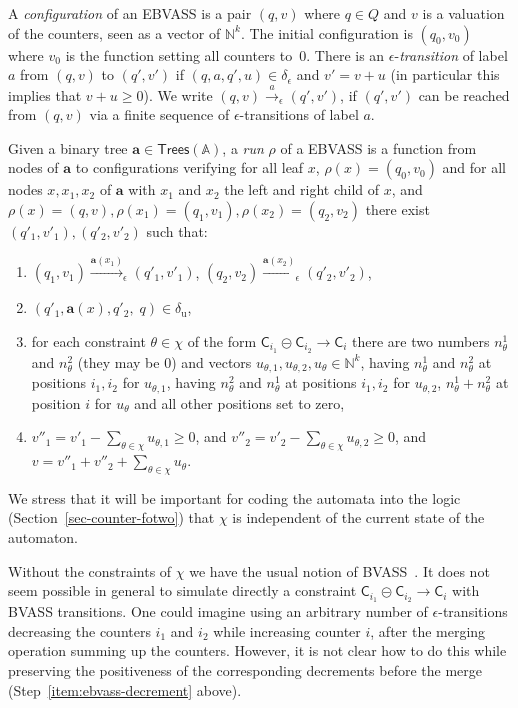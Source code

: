 \documentclass{CSML}
\newcommand\bvass{\textup{BVASS}\xspace}
\newcommand\ebvass{\textup{EBVASS}\xspace}
\newcommand\A{\ensuremath{\mathbb{A}}\xspace}
\newcommand\N{\ensuremath{\mathbb{N}}\xspace}
\newcommand\merc[3]{\mathsf{C}_{#1}\mathpunct{\circleddash}\mathsf{C}_{#2}\to\mathsf{C}_{#3}}
\newcommand\Trees{\mathsf{Trees}}
\newcommand\atree{\boldsymbol{a}}
\begin{document}
A \emph{configuration} of an \ebvass is a pair $(q,v)$ where $q\in Q$ 
and $v$ is a valuation of the counters, seen as a vector of $\N^k$. 
The initial configuration is $(q_0,v_0)$ where $v_0$ is the function setting all counters to~$0$.
There is an $\epsilon$-\emph{transition} of label $a$ from $(q,v)$ to $(q',v')$ if
$(q,a,q',u) \in \delta_\epsilon$ and $v'=v+u$ 
(in particular this implies that $v+u\geq 0$). 
We write $(q,v) \xrightarrow{a}_\epsilon (q',v')$, if $(q',v')$ can be reached from
$(q,v)$ via a finite sequence of $\epsilon$-transitions of label $a$.
 
Given a binary tree $\atree\in\Trees(\A)$, a \emph{run} $\rho$ of a \ebvass is a
function from nodes of $\atree$ to configurations verifying for all leaf $x$,
$\rho(x)=(q_0,v_0)$ and for all nodes $x,x_1,x_2$ of $\atree$ with $x_1$ and
$x_2$ the left and right child of $x$, and $\rho(x)=(q,v),
\rho(x_1)=(q_1,v_1), \rho(x_2)=(q_2,v_2)$ there exist $(q'_1,v'_1), (q'_2,v'_2)$
such that:

\begin{enumerate}
\item $(q_1,v_1) \xrightarrow{\atree(x_1)}_\epsilon (q'_1,v'_1)$, 
$(q_2,v_2) \xrightarrow{\atree(x_2)}_\epsilon (q'_2,v'_2)$,
\item $(q'_1,\atree(x),q'_2,\; q) \in \delta_{\text{u}}$,
\item for each constraint $\theta \in \chi$ of the form $\merc{i_1}{i_2}{i}$ 
there are two numbers $n^1_\theta$ and $n^2_\theta$ (they may be $0$)
and vectors $u_{\theta,1},u_{\theta,2},u_\theta \in\N^k$, having
$n^1_\theta$ and $n^2_\theta$ at positions $i_1,i_2$ for $u_{\theta,1}$, having
$n^2_\theta$ and $n^1_\theta$ at positions $i_1,i_2$ for $u_{\theta,2}$,
$n^1_\theta+n^2_\theta$ at position $i$ for $u_\theta$
and all other positions set to zero,
\item \label{item:ebvass-decrement}
      $v''_1 = v'_1 - \displaystyle\sum_{\theta\in\chi} u_{\theta,1} \geq 0$, and 
      $v''_2 = v'_2 - \displaystyle\sum_{\theta\in\chi} u_{\theta,2} \geq 0$, and
$v = v''_1 + v''_2+ \displaystyle\sum_{\theta\in\chi} u_\theta$. 
\end{enumerate}
\noindent
We stress that it will be important for coding the automata into the logic
(Section~\ref{sec-counter-fotwo}) that $\chi$ is independent of the current state of the automaton.

Without the constraints of $\chi$ we have the usual notion of
\bvass~\cite{acl10}. 
It does not seem possible in general to simulate directly a constraint
$\merc{i_1}{i_2}{i}$ with BVASS transitions.  One could imagine using an
arbitrary number of $\epsilon$-transitions decreasing the counters $i_1$ and
$i_2$ while increasing counter $i$, after the merging operation summing up the
counters.  However, it is not clear how to do this while preserving the
positiveness of the corresponding decrements before the merge
(Step~\ref{item:ebvass-decrement} above).
\end{document}
